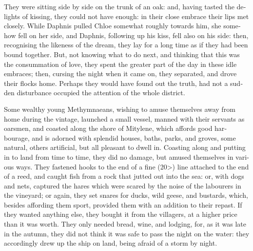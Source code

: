 \documentclass{book}
\begin{document}
\begin{pairs}
\begin{Rightside}
\begin{english}
  They were sitting side by side on the trunk of an oak: and, having tasted the delights of kissing, they could not have enough: in their close embrace their lips met closely.  While Daphnis pulled Chloe somewhat roughly towards him, she somehow fell on her side, and Daphnis, following up his kiss, fell also on his side: then, recognising the likeness of the dream, they lay for a long time as if they had been bound together.  But, not knowing what to do next, and thinking that this was the consummation of love, they spent the greater part of the day in these idle embraces; then, cursing the night when it came on, they separated, and drove their flocks home.  Perhaps they would have found out the truth, had not a sudden disturbance occupied the attention of the whole district.
\pend


  Some wealthy young Methymnaeans, wishing to amuse themselves away from home during the vintage, launched a small vessel, manned with their servants as oarsmen, and coasted along the shore of Mitylene, which affords good harbourage, and is adorned with splendid houses, baths, parks, and groves, some natural, others artificial, but all pleasant to dwell in.  Coasting along and putting in to land from time to time, they did no damage, but amused themselves in various ways.  They fastened hooks to the end of a fine (20>) line attached to the end of a reed, and caught fish from a rock that jutted out into the sea: or, with dogs and nets, captured the hares which were scared by the noise of the labourers in the vineyard; or again, they set snares for ducks, wild geese, and bustards, which, besides affording them sport, provided them with an addition to their repast.  If they wanted anything else, they bought it from the villagers, at a higher price than it was worth.  They only needed bread, wine, and lodging, for, as it was late in the autumn, they did not think it was safe to pass the night on the water: they accordingly drew up the ship on land, being afraid of a storm by night.
\pend



\end{english}
\end{Rightside}
\end{pairs}
\end{document}
